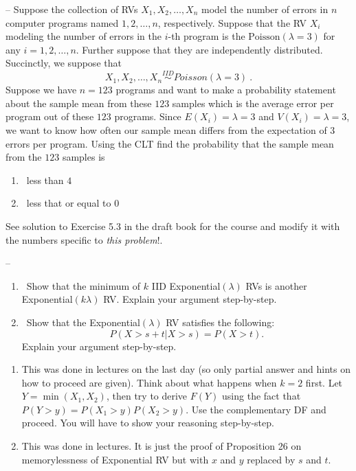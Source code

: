 \documentclass[11pt,paper=a4,abstract=on,parskip=half,DIV=calc,compact]{scrartcl}
\begin{document}
\begin{ExerciseList}
 --
Suppose the collection of RVs $X_1,X_2, \ldots, X_n$ model the number of errors in $n$ computer programs named $1,2,\ldots,n$, respectively.  
Suppose that the RV $X_i$ modeling the number of errors in the $i$-th program is the $\textrm{Poisson}(\lambda=3)$ for any $i=1,2,\ldots,n$.  
Further suppose that they are independently distributed.  Succinctly, we suppose that
\[
X_1,X_2,\ldots,X_n \overset{IID}{\sim} Poisson(\lambda=3) \ . 
\]
Suppose we have $n=123$ programs and want to make a probability statement about the sample mean from these $123$ samples which is the average error per program out of these $123$ programs.  
Since $E(X_i) = \lambda=3$ and $V(X_i)=\lambda=3$, we want to know how often our sample mean differs from the expectation of $3$ errors per program.
Using the CLT find the probability that the sample mean from the $123$ samples is 
\begin{enumerate}
\item ~less than $4$
\item ~less that or equal to $0$
\end{enumerate}
\Answer
See solution to Exercise 5.3 in the draft book for the course and modify it with the numbers specific to {\em this problem}!.

 --
\begin{enumerate}
\item
~Show that the minimum of $k$ IID Exponential$(\lambda)$ RVs is another Exponential$(k\lambda)$ RV. Explain your argument step-by-step. 
\item ~Show that the Exponential$(\lambda)$ RV satisfies the following: \[P(X > s+t | X>s) = P(X > t).\] Explain your argument step-by-step.
\end{enumerate}
\Answer
\begin{enumerate}
\item
This was done in lectures on the last day (so only partial answer and hints on how to proceed are given). Think about what happens when $k=2$ first.
Let $Y=\min(X_1,X_2)$, then try to derive $F(Y)$ using the fact that $P(Y>y) = P(X_1>y) P(X_2>y)$.
Use the complementary DF and proceed. You will have to show your reasoning step-by-step. 
\item
This was done in lectures. It is just the proof of Proposition 26 on memorylessness of Exponential RV but with $x$ and $y$ replaced by $s$ and $t$.
\end{enumerate}

\end{ExerciseList}





\thispagestyle{scrheadings}
\ihead{}
\chead{}
\ohead{}
\ifoot{}
\ofoot{}
\setheadsepline{0pt}


\newpage

\shipoutAnswer
\end{document}
